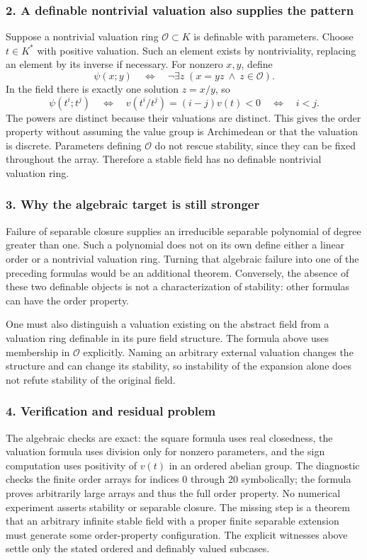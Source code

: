 \documentclass[11pt,a4paper]{article}
\begin{document}
\subsubsection{2. A definable nontrivial valuation also supplies the pattern}
Suppose a nontrivial valuation ring $\mathcal O\subset K$ is definable with parameters. Choose $t\in K^*$ with positive valuation. Such an element exists by nontriviality, replacing an element by its inverse if necessary. For nonzero $x,y$, define
\[\psi(x;y)\quad\Longleftrightarrow\quad
\neg\exists z\;(x=yz\ \wedge\ z\in\mathcal O).
\]
In the field there is exactly one solution $z=x/y$, so
\[\psi(t^i;t^j)\quad\Longleftrightarrow\quad
v(t^i/t^j)=(i-j)v(t)<0
\quad\Longleftrightarrow\quad i<j.
\]
The powers are distinct because their valuations are distinct. This gives the order property without assuming the value group is Archimedean or that the valuation is discrete. Parameters defining $\mathcal O$ do not rescue stability, since they can be fixed throughout the array. Therefore a stable field has no definable nontrivial valuation ring.

\subsubsection{3. Why the algebraic target is still stronger}
Failure of separable closure supplies an irreducible separable polynomial of degree greater than one. Such a polynomial does not on its own define either a linear order or a nontrivial valuation ring. Turning that algebraic failure into one of the preceding formulas would be an additional theorem. Conversely, the absence of these two definable objects is not a characterization of stability: other formulas can have the order property.

One must also distinguish a valuation existing on the abstract field from a valuation ring definable in its pure field structure. The formula above uses membership in $\mathcal O$ explicitly. Naming an arbitrary external valuation changes the structure and can change its stability, so instability of the expansion alone does not refute stability of the original field.

\subsubsection{4. Verification and residual problem}
The algebraic checks are exact: the square formula uses real closedness, the valuation formula uses division only for nonzero parameters, and the sign computation uses positivity of $v(t)$ in an ordered abelian group. The diagnostic checks the finite order arrays for indices 0 through 20 symbolically; the formula proves arbitrarily large arrays and thus the full order property. No numerical experiment asserts stability or separable closure. The missing step is a theorem that an arbitrary infinite stable field with a proper finite separable extension must generate some order-property configuration. The explicit witnesses above settle only the stated ordered and definably valued subcases.
\end{document}
